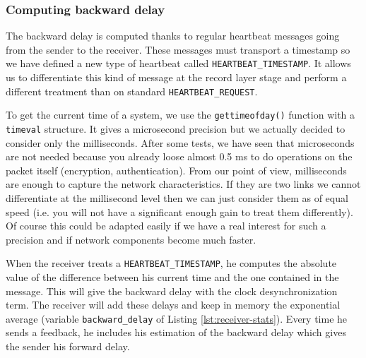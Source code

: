\subsubsection{Computing backward delay}

The backward delay is computed thanks to regular heartbeat messages going from the sender to the receiver. These messages must transport a timestamp so we have defined a new type of heartbeat called \texttt{HEARTBEAT\_TIMESTAMP}. It allows us to differentiate this kind of message at the record layer stage and perform a different treatment than on standard \texttt{HEARTBEAT\_REQUEST}. 

To get the current time of a system, we use the \texttt{gettimeofday()} function with a \texttt{timeval} structure. It gives a microsecond precision but we actually decided to consider only the milliseconds. After some tests, we have seen that microseconds are not needed because you already loose almost 0.5 ms to do operations on the packet itself (encryption, authentication). From our point of view, milliseconds are enough to capture the network characteristics. If they are two links we cannot differentiate at the millisecond level then we can just consider them as of equal speed (i.e. you will not have a significant enough gain to treat them differently). Of course this could be adapted easily if we have a real interest for such a precision and if network components become much faster.

When the receiver treats a \texttt{HEARTBEAT\_TIMESTAMP}, he computes the absolute value of the difference between his current time and the one contained in the message. This will give the backward delay with the clock desynchronization term. The receiver will add these delays and keep in memory the exponential average (variable \texttt{backward\_delay} of Listing \ref{lst:receiver-stats}). Every time he sends a feedback, he includes his estimation of the backward delay which gives the sender his forward delay.



